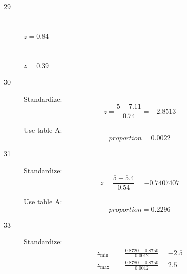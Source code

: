 \documentclass[letterpaper, landscape]{exam}
\begin{document}
\begin{description}
      \item[29]
        \begin{parts}
          \part{} $z = 0.84$
          \part{} $z = 0.39$ 
        \end{parts}

      \item[30]
        Standardize:
        \[
          z = \frac{5 - 7.11}{0.74} = -2.8513
        \]

        Use table A:\@
        \[
          proportion = \boxed{ 0.0022 } 
        \]

      \item[31]
        Standardize:
        \[
          z = \frac{5 - 5.4}{0.54} = -0.7407407
        \]

        Use table A:\@
        \[
          proportion = \boxed{ 0.2296 } 
        \]






      \item[33]
        Standardize:
        \begin{align*}
          z_{\min} & = \frac{0.8720 - 0.8750}{0.0012} = -2.5 \\
          z_{\max} & = \frac{0.8780 - 0.8750}{0.0012} = 2.5 \\
        \end{align*}


\end{description}
\end{document}
